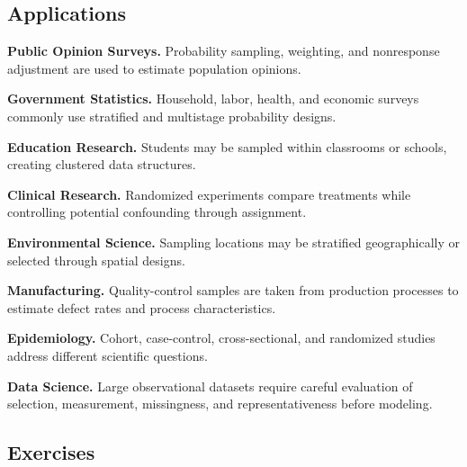 \subsection{Applications}
\label{subsec:data-collection-applications}

\begin{applicationbox}

\textbf{Public Opinion Surveys.}
Probability sampling, weighting, and nonresponse adjustment are used to
estimate population opinions.

\medskip

\textbf{Government Statistics.}
Household, labor, health, and economic surveys commonly use stratified
and multistage probability designs.

\medskip

\textbf{Education Research.}
Students may be sampled within classrooms or schools, creating clustered
data structures.

\medskip

\textbf{Clinical Research.}
Randomized experiments compare treatments while controlling potential
confounding through assignment.

\medskip

\textbf{Environmental Science.}
Sampling locations may be stratified geographically or selected through
spatial designs.

\medskip

\textbf{Manufacturing.}
Quality-control samples are taken from production processes to estimate
defect rates and process characteristics.

\medskip

\textbf{Epidemiology.}
Cohort, case-control, cross-sectional, and randomized studies address
different scientific questions.

\medskip

\textbf{Data Science.}
Large observational datasets require careful evaluation of selection,
measurement, missingness, and representativeness before modeling.

\end{applicationbox}

\subsection{Exercises}
\label{subsec:data-collection-exercises}

